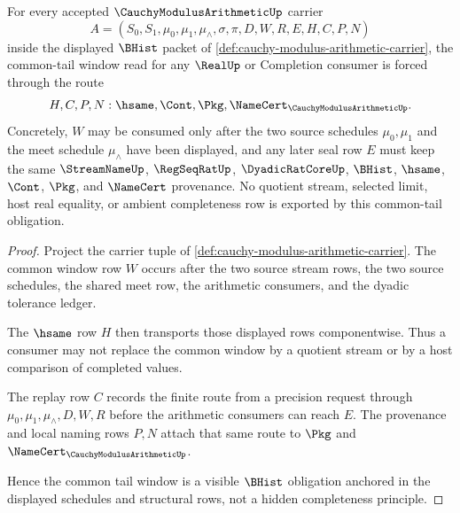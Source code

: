 \begin{theorem}
\label{thm:cauchy-modulus-arithmetic-common-tail-window}
For every accepted $\CauchyModulusArithmeticUp$ carrier
$$
A=(S_0,S_1,\mu_0,\mu_1,\mu_{\wedge},\sigma,\pi,D,W,R,E,H,C,P,N)
$$
inside the displayed $\BHist$ packet of
\autoref{def:cauchy-modulus-arithmetic-carrier}, the common-tail window read for
any $\RealUp$ or Completion consumer is forced through the route
$$
H,C,P,N:
\hsame,\Cont,\Pkg,\NameCert_{\CauchyModulusArithmeticUp}.
$$
Concretely, $W$ may be consumed only after the two source schedules
$\mu_0,\mu_1$ and the meet schedule $\mu_{\wedge}$ have been displayed, and any
later seal row $E$ must keep the same $\StreamNameUp$, $\RegSeqRatUp$,
$\DyadicRatCoreUp$, $\BHist$, $\hsame$, $\Cont$, $\Pkg$, and $\NameCert$
provenance. No quotient stream, selected limit, host real equality, or ambient
completeness row is exported by this common-tail obligation.
\end{theorem}
\begin{proof}
Project the carrier tuple of
\autoref{def:cauchy-modulus-arithmetic-carrier}. The common window row $W$ occurs
after the two source stream rows, the two source schedules, the shared meet row,
the arithmetic consumers, and the dyadic tolerance ledger.

The $\hsame$ row $H$ then transports those displayed rows componentwise. Thus a
consumer may not replace the common window by a quotient stream or by a host
comparison of completed values.

The replay row $C$ records the finite route from a precision request through
$\mu_0,\mu_1,\mu_{\wedge},D,W,R$ before the arithmetic consumers can reach $E$.
The provenance and local naming rows $P,N$ attach that same route to
$\Pkg$ and $\NameCert_{\CauchyModulusArithmeticUp}$.

Hence the common tail window is a visible $\BHist$ obligation anchored in the
displayed schedules and structural rows, not a hidden completeness principle.
\end{proof}

